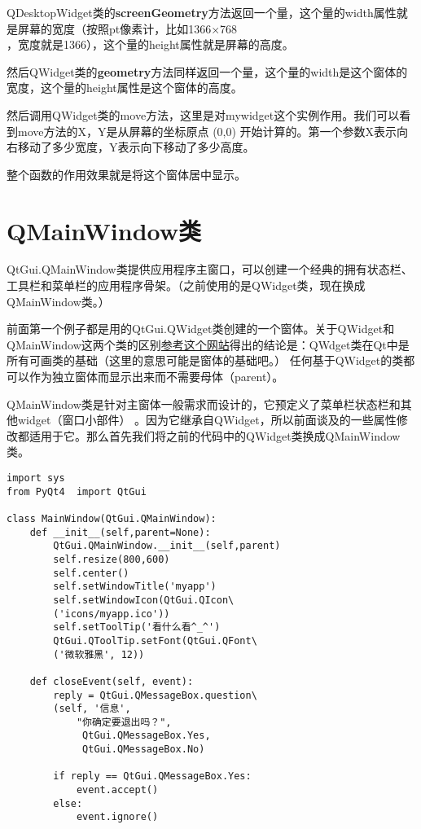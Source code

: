 \documentclass[12pt,oneside]{book}
\begin{document}
\begin{common-format}
QDesktopWidget类的\textbf{screenGeometry}方法返回一个量，这个量的width属性就是屏幕的宽度（按照pt像素计，比如1366×768\\，宽度就是1366），这个量的height属性就是屏幕的高度。

然后QWidget类的\textbf{geometry}方法同样返回一个量，这个量的width是这个窗体的宽度，这个量的height属性是这个窗体的高度。

然后调用QWidget类的move方法，这里是对mywidget这个实例作用。我们可以看到move方法的X，Y是从屏幕的坐标原点 (0,0) 开始计算的。第一个参数X表示向右移动了多少宽度，Y表示向下移动了多少高度。

整个函数的作用效果就是将这个窗体居中显示。


\section{QMainWindow类}
QtGui.QMainWindow类提供应用程序主窗口，可以创建一个经典的拥有状态栏、工具栏和菜单栏的应用程序骨架。（之前使用的是QWidget类，现在换成QMainWindow类。）

前面第一个例子都是用的QtGui.QWidget类创建的一个窗体。关于QWidget和QMainWindow这两个类的区别\href{http://stackoverflow.com/questions/3298792/whats-the-difference-between-qmainwindow-and-qwidget-and-qdialog}{参考这个网站}得出的结论是：QWdget类在Qt中是所有可画类的基础（这里的意思可能是窗体的基础吧。） 任何基于QWidget的类都可以作为独立窗体而显示出来而不需要母体（parent）。

QMainWindow类是针对主窗体一般需求而设计的，它预定义了菜单栏状态栏和其他widget（窗口小部件） 。因为它继承自QWidget，所以前面谈及的一些属性修改都适用于它。那么首先我们将之前的代码中的QWidget类换成QMainWindow类。


\begin{Verbatim}
import sys
from PyQt4  import QtGui

class MainWindow(QtGui.QMainWindow):
    def __init__(self,parent=None):
        QtGui.QMainWindow.__init__(self,parent)
        self.resize(800,600)
        self.center()
        self.setWindowTitle('myapp')
        self.setWindowIcon(QtGui.QIcon\
        ('icons/myapp.ico'))
        self.setToolTip('看什么看^_^')
        QtGui.QToolTip.setFont(QtGui.QFont\
        ('微软雅黑', 12))

    def closeEvent(self, event):
        reply = QtGui.QMessageBox.question\
        (self, '信息',
            "你确定要退出吗？",
             QtGui.QMessageBox.Yes,
             QtGui.QMessageBox.No)

        if reply == QtGui.QMessageBox.Yes:
            event.accept()
        else:
            event.ignore()


\end{Verbatim}
\end{common-format}
\end{document}
